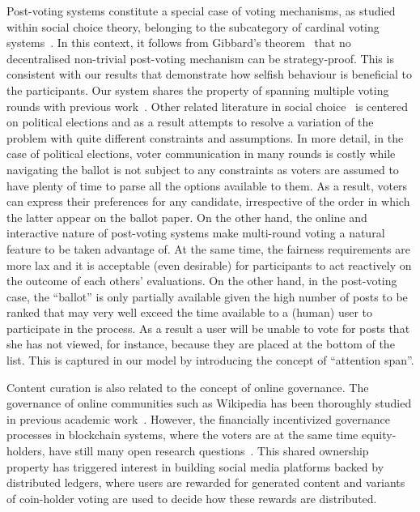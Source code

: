   Post-voting systems constitute a special case of voting mechanisms, as studied
  within social choice theory, belonging to the subcategory of cardinal voting
  systems~\cite{hillinger2005case}. In this context, it follows from Gibbard's
  theorem~\cite{gibbard1973manipulation} that no decentralised non-trivial
  post-voting mechanism can be strategy-proof. This is consistent with our
  results that demonstrate how selfish behaviour is beneficial to the
  participants. Our system shares the property of spanning multiple voting
  rounds with previous work~\cite{kalech2011practical}. Other related literature
  in social
  choice~\cite{lu2011robust,conitzer2005communication,xia2010compilation} is
  centered on political elections and as a result attempts to resolve a
  variation of the problem with quite different constraints and assumptions. In
  more detail, in the case of political elections, voter communication in many
  rounds is costly while navigating the ballot is not subject to any constraints
  as voters are assumed to have plenty of time to parse all the options
  available to them. As a result, voters can express their preferences for any
  candidate, irrespective of the order in which the latter appear on the ballot
  paper. On the other hand, the online and interactive nature of post-voting
  systems make multi-round voting a natural feature to be taken advantage of. At
  the same time, the fairness requirements are more lax and it is acceptable
  (even desirable) for participants to act reactively on the outcome of each
  others' evaluations. On the other hand, in the post-voting case, the
  ``ballot'' is only partially available given the high number of posts to be
  ranked that may very well exceed the time available to a (human) user to
  participate in the process. As a result a user will be unable to vote for
  posts that she has not viewed, for instance, because they are placed at the
  bottom of the list. This is captured in our model by introducing the concept
  of ``attention span''.

  Content curation is also related to the concept of online governance. The
  governance of online communities such as Wikipedia has been thoroughly studied
  in previous academic work~\cite{leskovec2010governance,forte2008scaling}.
  However, the financially incentivized governance processes in blockchain
  systems, where the voters are at the same time equity-holders, have still many
  open research questions~\cite{vitalik,ehrsam}. This shared ownership property
  has triggered interest in building social media platforms backed by
  distributed ledgers, where users are rewarded for generated content and
  variants of coin-holder voting are used to decide how these rewards are
  distributed.

